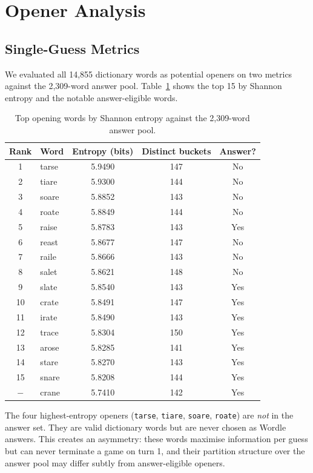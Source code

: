 \documentclass{article}
\begin{document}
\section{Opener Analysis}
\label{sec:openers}

\subsection{Single-Guess Metrics}

We evaluated all 14,855 dictionary words as potential openers on two metrics
against the 2,309-word answer pool. Table~\ref{tab:entropy_top} shows the top
15 by Shannon entropy and the notable answer-eligible words.

\begin{table}[h]
  \centering
  \caption{Top opening words by Shannon entropy against the 2,309-word answer pool.}
  \label{tab:entropy_top}
  \begin{tabular}{clccc}
    \toprule
    Rank & Word & Entropy (bits) & Distinct buckets & Answer? \\
    \midrule
    1  & tarse & 5.9490 & 147 & No \\
    2  & tiare & 5.9300 & 144 & No \\
    3  & soare & 5.8852 & 143 & No \\
    4  & roate & 5.8849 & 144 & No \\
    5  & raise & 5.8783 & 143 & Yes \\
    6  & reast & 5.8677 & 147 & No \\
    7  & raile & 5.8666 & 143 & No \\
    8  & salet & 5.8621 & 148 & No \\
    9  & slate & 5.8540 & 143 & Yes \\
    10 & crate & 5.8491 & 147 & Yes \\
    11 & irate & 5.8490 & 143 & Yes \\
    12 & trace & 5.8304 & 150 & Yes \\
    13 & arose & 5.8285 & 141 & Yes \\
    14 & stare & 5.8270 & 143 & Yes \\
    15 & snare & 5.8208 & 144 & Yes \\
    \midrule
    $-$ & crane & 5.7410 & 142 & Yes \\
    \bottomrule
  \end{tabular}
\end{table}

The four highest-entropy openers (\texttt{tarse},
\texttt{tiare}, \texttt{soare}, \texttt{roate}) are \emph{not} in the answer set.
They are valid dictionary words but are never chosen as Wordle answers.
This creates an asymmetry: these words maximise information per guess but can
never terminate a game on turn 1, and their partition structure over the answer
pool may differ subtly from answer-eligible openers.
\end{document}
